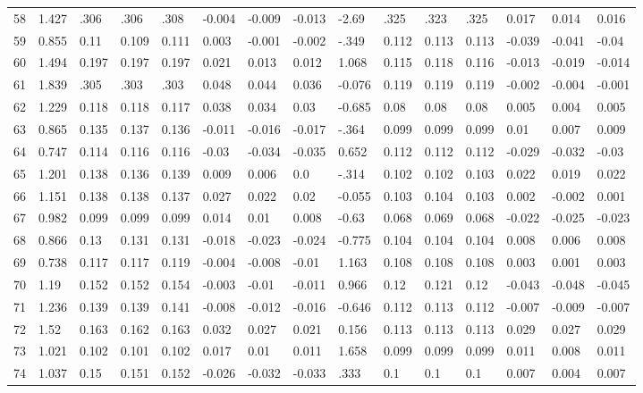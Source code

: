 \begin{table}
\begin{tabular}{|l|l|lll|lll|l|lll|lll}
		58 & 1.427 & .306 & .306 & .308 & -0.004 & -0.009 & -0.013 & -2.69 & .325 & .323 & .325 & 0.017 & 0.014 & 0.016 \\
		59 & 0.855 & 0.11 & 0.109 & 0.111 & 0.003 & -0.001 & -0.002 & -.349 & 0.112 & 0.113 & 0.113 & -0.039 & -0.041 & -0.04 \\
		60 & 1.494 & 0.197 & 0.197 & 0.197 & 0.021 & 0.013 & 0.012 & 1.068 & 0.115 & 0.118 & 0.116 & -0.013 & -0.019 & -0.014 \\
		61 & 1.839 & .305 & .303 & .303 & 0.048 & 0.044 & 0.036 & -0.076 & 0.119 & 0.119 & 0.119 & -0.002 & -0.004 & -0.001 \\
		62 & 1.229 & 0.118 & 0.118 & 0.117 & 0.038 & 0.034 & 0.03 & -0.685 & 0.08 & 0.08 & 0.08 & 0.005 & 0.004 & 0.005 \\
		63 & 0.865 & 0.135 & 0.137 & 0.136 & -0.011 & -0.016 & -0.017 & -.364 & 0.099 & 0.099 & 0.099 & 0.01 & 0.007 & 0.009 \\
		64 & 0.747 & 0.114 & 0.116 & 0.116 & -0.03 & -0.034 & -0.035 & 0.652 & 0.112 & 0.112 & 0.112 & -0.029 & -0.032 & -0.03 \\
		65 & 1.201 & 0.138 & 0.136 & 0.139 & 0.009 & 0.006 & 0.0 & -.314 & 0.102 & 0.102 & 0.103 & 0.022 & 0.019 & 0.022 \\
		66 & 1.151 & 0.138 & 0.138 & 0.137 & 0.027 & 0.022 & 0.02 & -0.055 & 0.103 & 0.104 & 0.103 & 0.002 & -0.002 & 0.001 \\
		67 & 0.982 & 0.099 & 0.099 & 0.099 & 0.014 & 0.01 & 0.008 & -0.63 & 0.068 & 0.069 & 0.068 & -0.022 & -0.025 & -0.023 \\
		68 & 0.866 & 0.13 & 0.131 & 0.131 & -0.018 & -0.023 & -0.024 & -0.775 & 0.104 & 0.104 & 0.104 & 0.008 & 0.006 & 0.008 \\
		69 & 0.738 & 0.117 & 0.117 & 0.119 & -0.004 & -0.008 & -0.01 & 1.163 & 0.108 & 0.108 & 0.108 & 0.003 & 0.001 & 0.003 \\
		70 & 1.19 & 0.152 & 0.152 & 0.154 & -0.003 & -0.01 & -0.011 & 0.966 & 0.12 & 0.121 & 0.12 & -0.043 & -0.048 & -0.045 \\
		71 & 1.236 & 0.139 & 0.139 & 0.141 & -0.008 & -0.012 & -0.016 & -0.646 & 0.112 & 0.113 & 0.112 & -0.007 & -0.009 & -0.007 \\
		72 & 1.52 & 0.163 & 0.162 & 0.163 & 0.032 & 0.027 & 0.021 & 0.156 & 0.113 & 0.113 & 0.113 & 0.029 & 0.027 & 0.029 \\
		73 & 1.021 & 0.102 & 0.101 & 0.102 & 0.017 & 0.01 & 0.011 & 1.658 & 0.099 & 0.099 & 0.099 & 0.011 & 0.008 & 0.011 \\
		74 & 1.037 & 0.15 & 0.151 & 0.152 & -0.026 & -0.032 & -0.033 & .333 & 0.1 & 0.1 & 0.1 & 0.007 & 0.004 & 0.007 
	\end{tabular}
	
\end{table}
